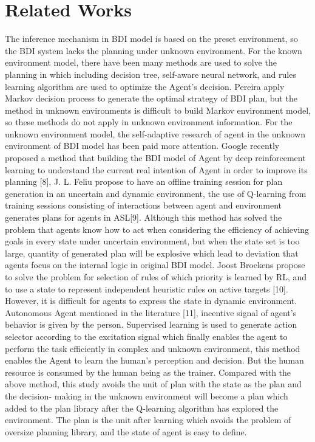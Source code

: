 \documentclass{article}
\begin{document}
\section{Related Works}
The inference mechanism in BDI model is based on the preset
environment, so the BDI system lacks the planning under
unknown environment. For the known environment model, there
have been many methods are used to solve the planning in which
including decision tree, self-aware neural network, and rules
learning algorithm are used to optimize the Agent’s decision.
Pereira apply Markov decision process to generate the optimal
strategy of BDI plan, but the method in unknown environments is
difficult to build Markov environment model, so these methods do
not apply in unknown environment information.
For the unknown environment model, the self-adaptive research
of agent in the unknown environment of BDI model has been paid
more attention. Google recently proposed a method that building
the BDI model of Agent by deep reinforcement learning to
understand the current real intention of Agent in order to improve
its planning [8], J. L. Feliu propose to have an offline training
session for plan generation in an uncertain and dynamic
environment, the use of Q-learning from training sessions
consisting of interactions between agent and environment
generates plans for agents in ASL[9]. Although this method has
solved the problem that agents know how to act when considering
the efficiency of achieving goals in every state under uncertain
environment, but when the state set is too large, quantity of
generated plan will be explosive which lead to deviation that
agents focus on the internal logic in original BDI model. Joost
Broekens propose to solve the problem for selection of rules of
which priority is learned by RL, and to use a state to represent
independent heuristic rules on active targets [10]. However, it is
difficult for agents to express the state in dynamic environment.
Autonomous Agent mentioned in the literature [11], incentive
signal of agent's behavior is given by the person. Supervised
learning is used to generate action selector according to the
excitation signal which finally enables the agent to perform the
task efficiently in complex and unknown environment, this
method enables the Agent to learn the human’s perception and 
decision. But the human resource is consumed by the human
being as the trainer.
Compared with the above method, this study avoids the unit of
plan with the state as the plan and the decision- making in the
unknown environment will become a plan which added to the
plan library after the Q-learning algorithm has explored the
environment. The plan is the unit after learning which avoids the
problem of oversize planning library, and the state of agent is
easy to define.
\end{document}
